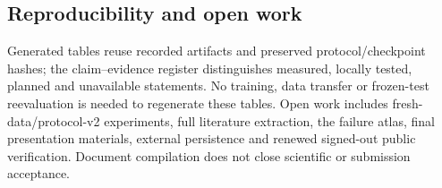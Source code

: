\documentclass[conference]{IEEEtran}
\begin{document}
\subsection{Reproducibility and open work}
Generated tables reuse recorded artifacts and preserved protocol/checkpoint hashes; the claim--evidence register distinguishes measured, locally tested, planned and unavailable statements. No training, data transfer or frozen-test reevaluation is needed to regenerate these tables. Open work includes fresh-data/protocol-v2 experiments, full literature extraction, the failure atlas, final presentation materials, external persistence and renewed signed-out public verification. Document compilation does not close scientific or submission acceptance.



\end{document}
